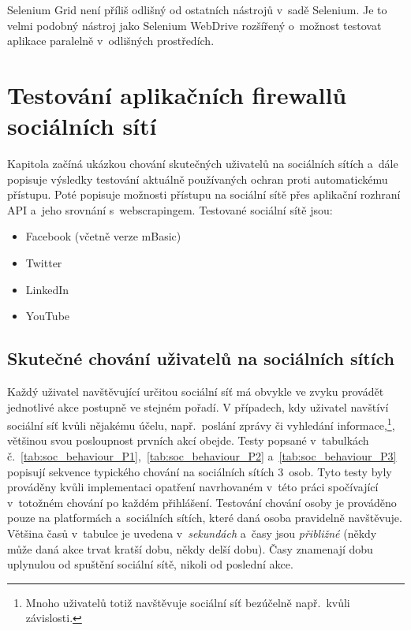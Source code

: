 Selenium Grid není příliš odlišný od ostatních nástrojů v~sadě Selenium. Je to velmi podobný nástroj jako Selenium WebDrive rozšířený o~možnost testovat aplikace paralelně v~odlišných prostředích.

\chapter{Testování aplikačních firewallů sociálních sítí}
\label{chap:app_firewalls_tests}
Kapitola začíná ukázkou chování skutečných uživatelů na sociálních sítích a~dále popisuje výsledky testování aktuálně používaných ochran proti automatickému přístupu. Poté popisuje možnosti přístupu na sociální sítě přes aplikační rozhraní API a~jeho srovnání s~webscrapingem. Testované sociální sítě jsou:

\begin{itemize}
  \item Facebook (včetně verze mBasic)
  \item Twitter
  \item LinkedIn
  \item YouTube
\end{itemize}

\section{Skutečné chování uživatelů na sociálních sítích}
Každý uživatel navštěvující určitou sociální síť má obvykle ve zvyku provádět jednotlivé akce postupně ve stejném pořadí. V případech, kdy uživatel navštíví sociální síť kvůli nějakému účelu, např.~poslání zprávy či vyhledání informace,\footnote{Mnoho uživatelů totiž navštěvuje sociální síť bezúčelně např.~kvůli závislosti.}, většinou svou posloupnost prvních akcí obejde. Testy popsané v~tabulkách č.~\ref{tab:soc_behaviour_P1},~\ref{tab:soc_behaviour_P2} a~\ref{tab:soc_behaviour_P3} popisují sekvence typického chování na sociálních sítích 3~osob. Tyto testy byly prováděny kvůli implementaci opatření navrhovaném v~této práci spočívající v~totožném chování po každém přihlášení. Testování chování osoby je prováděno pouze na platformách a~sociálních sítích, které daná osoba pravidelně navštěvuje. Většina časů v~tabulce je uvedena v~\textit{sekundách} a~časy jsou \textit{přibližné} (někdy může daná akce trvat kratší dobu, někdy delší dobu). Časy znamenají dobu uplynulou od spuštění sociální sítě, nikoli od poslední akce.

